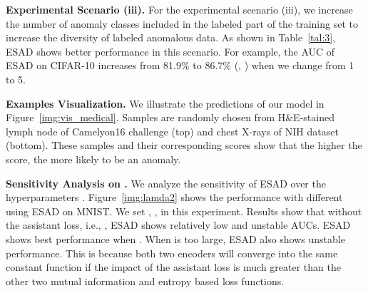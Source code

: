 \documentclass{bmvc2k}
\begin{document}
\noindent\textbf{Experimental Scenario (iii).} For the experimental scenario (iii), we increase the number of anomaly classes  included in the labeled part of the training set to increase the diversity of labeled anomalous data. As shown in Table~\ref{tal:3}, ESAD shows better performance in this scenario. For example, the AUC of ESAD on CIFAR-10 increases from 81.9\% to 86.7\% (, ) when we change  from 1 to 5.

\noindent \textbf{Examples Visualization.} We illustrate the predictions of our model in Figure~\ref{img:vis_medical}. Samples are randomly chosen from H\&E-stained lymph node of Camelyon16 challenge \cite{bejnordi2017diagnostic} (top) and chest X-rays of NIH dataset \cite{wang2017chestx} (bottom). These samples and their corresponding scores show that the higher the score, the more likely to be an anomaly.

\noindent \textbf{Sensitivity Analysis on .}
We analyze the sensitivity of ESAD over the hyperparameters . Figure~\ref{img:lamda2} shows the performance with different  using ESAD on MNIST. We set , ,  in this experiment. Results show that without the assistant loss, i.e., , ESAD shows relatively low and unstable AUCs. ESAD shows best performance when . When  is too large, ESAD also shows unstable performance. This is because both two encoders will converge into the same constant function if the impact of the assistant loss is much greater than the other two mutual information and entropy based loss functions.
\end{document}
